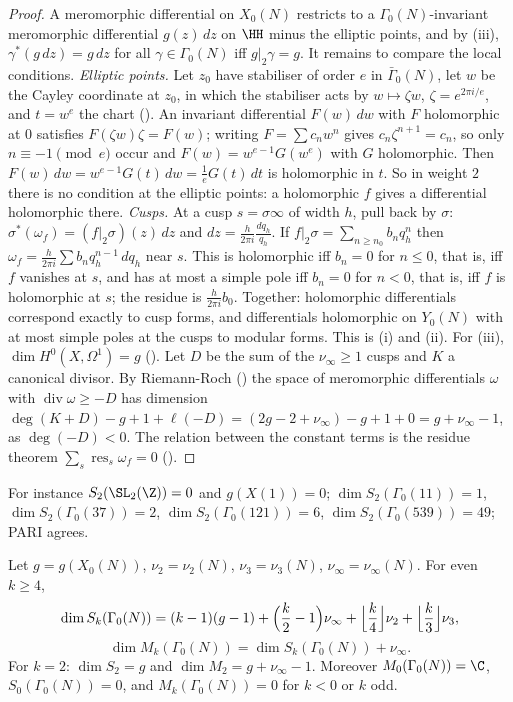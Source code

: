 \begin{proof}
A meromorphic differential on $X_0(N)$ restricts to a $\Gamma_0(N)$-invariant meromorphic differential $g(z)\,dz$ on $\HH$ minus the elliptic points, and by
(iii), $\gamma^*(g\,dz)=g\,dz$ for all $\gamma\in\Gamma_0(N)$ iff $g|_2\gamma=g$. It remains to compare the local conditions.
\emph{Elliptic points.} Let $z_0$ have stabiliser of order $e$ in $\bar\Gamma_0(N)$, let $w$ be the Cayley coordinate at $z_0$, in which the stabiliser acts by $w\mapsto\zeta w$,
$\zeta=e^{2\pi i/e}$, and $t=w^e$ the chart (). An invariant differential $F(w)\,dw$ with $F$ holomorphic at $0$ satisfies $F(\zeta w)\zeta=F(w)$;
writing $F=\sum c_nw^n$ gives $c_n\zeta^{n+1}=c_n$, so only $n\equiv-1\pmod e$ occur and $F(w)=w^{e-1}G(w^e)$ with $G$ holomorphic. Then $F(w)\,dw=w^{e-1}G(t)\,dw=\frac1eG(t)\,dt$ is
holomorphic in $t$. So in weight $2$ there is no condition at the elliptic points: a holomorphic $f$ gives a differential holomorphic there.
\emph{Cusps.} At a cusp $s=\sigma\infty$ of width $h$, pull back by $\sigma$: $\sigma^*(\omega_f)=(f|_2\sigma)(z)\,dz$ and $dz=\frac h{2\pi i}\frac{dq_h}{q_h}$. If $f|_2\sigma=\sum_{n\ge n_0}b_nq_h^n$ then
$\omega_f=\frac h{2\pi i}\sum b_nq_h^{n-1}\,dq_h$ near $s$. This is holomorphic iff $b_n=0$ for $n\le0$, that is, iff $f$ vanishes at $s$, and has at most a simple pole iff $b_n=0$ for $n<0$,
that is, iff $f$ is holomorphic at $s$; the residue is $\frac h{2\pi i}b_0$.
Together: holomorphic differentials correspond exactly to cusp forms, and differentials holomorphic on $Y_0(N)$ with at most simple poles at the cusps to modular forms. This is
(i) and (ii). For (iii), $\dim H^0(X,\Omega^1)=g$ (). Let $D$ be the sum of the $\nu_\infty\ge1$ cusps and $K$ a canonical divisor. By Riemann-Roch () the space of
meromorphic differentials $\omega$ with $\operatorname{div}\omega\ge-D$ has dimension $\deg(K+D)-g+1+\ell(-D)=(2g-2+\nu_\infty)-g+1+0=g+\nu_\infty-1$, as $\deg(-D)<0$. The relation between the
constant terms is the residue theorem $\sum_s\operatorname{res}_s\omega_f=0$ ().
\end{proof}

For instance $S_2(\SL_2(\Z))=0$ and $g(X(1))=0$; $\dim S_2(\Gamma_0(11))=1$, $\dim S_2(\Gamma_0(37))=2$, $\dim S_2(\Gamma_0(121))=6$, $\dim S_2(\Gamma_0(539))=49$; PARI agrees.

\begin{theorem}\label{thm:modforms:dimension-formulas}
Let $g=g(X_0(N))$, $\nu_2=\nu_2(N)$, $\nu_3=\nu_3(N)$, $\nu_\infty=\nu_\infty(N)$. For even $k\ge4$,
\[
\dim S_k(\Gamma_0(N))=(k-1)(g-1)+\Bigl(\frac k2-1\Bigr)\nu_\infty+\Bigl\lfloor\frac k4\Bigr\rfloor\nu_2+\Bigl\lfloor\frac k3\Bigr\rfloor\nu_3,
\]
\[
\dim M_k(\Gamma_0(N))=\dim S_k(\Gamma_0(N))+\nu_\infty.
\]
For $k=2$: $\dim S_2=g$ and $\dim M_2=g+\nu_\infty-1$. Moreover $M_0(\Gamma_0(N))=\C$, $S_0(\Gamma_0(N))=0$, and $M_k(\Gamma_0(N))=0$ for $k<0$ or $k$ odd.
\end{theorem}

